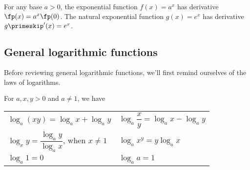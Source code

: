 \begin{theorem}\label{thm_baby_exp_deriv}
For any base $a>0$, the exponential function $f(x)=a^x$ has derivative $\fp(x)=a^x\fp(0)$. The natural exponential function $g(x)=e^x$ has derivative $g\primeskip'(x)=e^x$.
\end{theorem}



\subsection{General logarithmic functions}

Before reviewing general logarithmic functions, we'll first remind ourselves of the laws of logarithms.

\begin{keyidea}\label{ki_log_laws}
For $a,x,y>0$ and $a\ne1$, we have\\
\begin{anywhereenum}
\renewcommand{\arraystretch}{1.4}
\begin{tabular}{ll}
\item$\log_a(xy)=\log_ax+\log_ay$ &
\item$\log_a\dfrac xy=\log_ax-\log_ay$ \\
\item$\log_xy=\dfrac{\log_ay}{\log_ax}$, when $x\ne1$\qquad\null &
\item$\log_ax^y=y\log_ax$ \\
\item$\log_a1=0$ &
\item$\log_aa=1$
\end{tabular}
\end{anywhereenum}
\end{keyidea}

